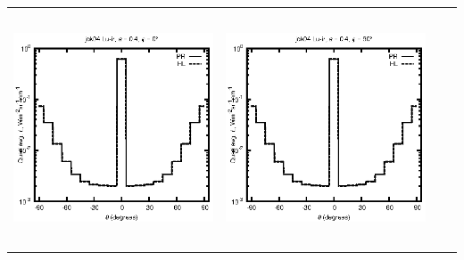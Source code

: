 \documentclass[10pt,a4paper]{article}
\begin{document}
\begin{adjustwidth}{-1.2in}{-1.2in}
\begin{tabular}{c c c c}
\includegraphics[height=7cm]{../eps/jok04_Lu_ir_fwd.eps} &
\includegraphics[height=7cm]{../eps/jok04_Lu_ir_cross.eps} \\
\end{tabular}

\pagebreak


\end{adjustwidth}
\end{document}
